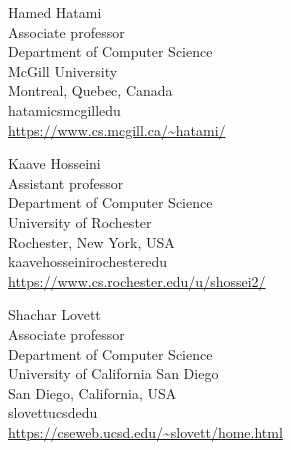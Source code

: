 \documentclass{toc}
\begin{document}
%
%
%
%
%
\begin{tocauthors}
\begin{tocinfo}[hatami]
 Hamed Hatami\\
 Associate professor\\
 Department of Computer Science\\
 McGill University\\
Montreal, Quebec, Canada\\
 hatami\tocat{}cs\tocdot{}mcgill\tocdot{}edu \\   %
 \url{https://www.cs.mcgill.ca/~hatami/}      %
\end{tocinfo}
\begin{tocinfo}[hosseini]
Kaave Hosseini\\
 Assistant professor\\
 Department of Computer Science\\
 University of Rochester\\
Rochester, New York, USA\\
 kaave\tocdot{}hosseini\tocat{}rochester\tocdot{}edu \\   %
 \url{https://www.cs.rochester.edu/u/shossei2/}      %
\end{tocinfo}
\begin{tocinfo}[lovett]
Shachar Lovett\\
 Associate professor\\
 Department of Computer Science\\
 University of California San Diego\\
San Diego, California, USA\\
 slovett\tocat{}ucsd\tocdot{}edu \\   %
 \url{https://cseweb.ucsd.edu/~slovett/home.html}      %
\end{tocinfo}
\end{tocauthors}
\end{document}
